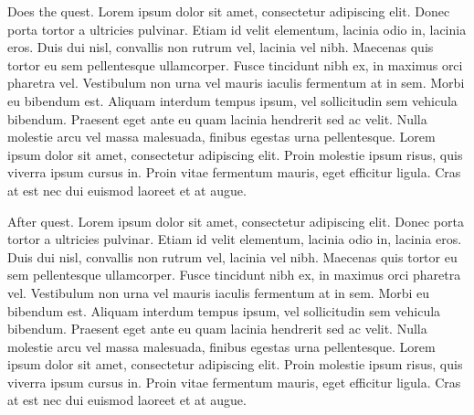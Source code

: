 
Does the quest. Lorem ipsum dolor sit amet, consectetur adipiscing elit. Donec porta tortor a ultricies pulvinar. Etiam id velit elementum, lacinia odio in, lacinia eros. Duis dui nisl, convallis non rutrum vel, lacinia vel nibh. Maecenas quis tortor eu sem pellentesque ullamcorper. Fusce tincidunt nibh ex, in maximus orci pharetra vel. Vestibulum non urna vel mauris iaculis fermentum at in sem. Morbi eu bibendum est. Aliquam interdum tempus ipsum, vel sollicitudin sem vehicula bibendum. Praesent eget ante eu quam lacinia hendrerit sed ac velit. Nulla molestie arcu vel massa malesuada, finibus egestas urna pellentesque. Lorem ipsum dolor sit amet, consectetur adipiscing elit. Proin molestie ipsum risus, quis viverra ipsum cursus in. Proin vitae fermentum mauris, eget efficitur ligula. Cras at est nec dui euismod laoreet et at augue.


After quest. Lorem ipsum dolor sit amet, consectetur adipiscing elit. Donec porta tortor a ultricies pulvinar. Etiam id velit elementum, lacinia odio in, lacinia eros. Duis dui nisl, convallis non rutrum vel, lacinia vel nibh. Maecenas quis tortor eu sem pellentesque ullamcorper. Fusce tincidunt nibh ex, in maximus orci pharetra vel. Vestibulum non urna vel mauris iaculis fermentum at in sem. Morbi eu bibendum est. Aliquam interdum tempus ipsum, vel sollicitudin sem vehicula bibendum. Praesent eget ante eu quam lacinia hendrerit sed ac velit. Nulla molestie arcu vel massa malesuada, finibus egestas urna pellentesque. Lorem ipsum dolor sit amet, consectetur adipiscing elit. Proin molestie ipsum risus, quis viverra ipsum cursus in. Proin vitae fermentum mauris, eget efficitur ligula. Cras at est nec dui euismod laoreet et at augue.
